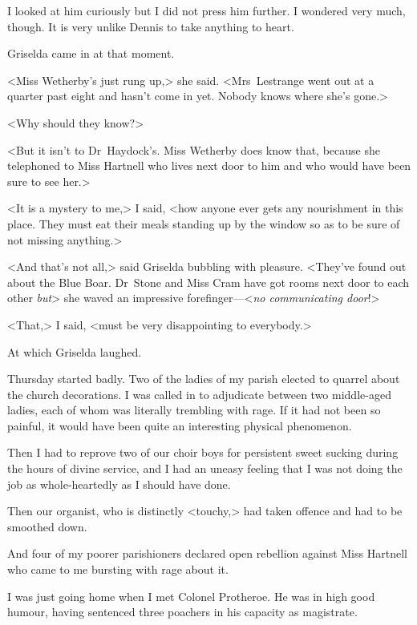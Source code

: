 I looked at him curiously but I did not press him further. I wondered very much, though. It is very unlike Dennis to take anything to heart.

Griselda came in at that moment.

<Miss Wetherby's just rung up,> she said. <Mrs~Lestrange went out at a quarter past eight and hasn't come in yet. Nobody knows where she's gone.>

<Why should they know?>

<But it isn't to Dr~Haydock's. Miss Wetherby does know that, because she telephoned to Miss Hartnell who lives next door to him and who would have been sure to see her.>

<It is a mystery to me,> I said, <how anyone ever gets any nourishment in this place. They must eat their meals standing up by the window so as to be sure of not missing anything.>

<And that's not all,> said Griselda bubbling with pleasure. <They've found out about the Blue Boar. Dr~Stone and Miss Cram have got rooms next door to each other \emph{but}\longdash> she waved an impressive forefinger—<\emph{no communicating door}!>

<That,> I said, <must be very disappointing to everybody.>

At which Griselda laughed.

Thursday started badly. Two of the ladies of my parish elected to quarrel about the church decorations. I was called in to adjudicate between two middle-aged ladies, each of whom was literally trembling with rage. If it had not been so painful, it would have been quite an interesting physical phenomenon.

Then I had to reprove two of our choir boys for persistent sweet sucking during the hours of divine service, and I had an uneasy feeling that I was not doing the job as whole-heartedly as I should have done.

Then our organist, who is distinctly <touchy,> had taken offence and had to be smoothed down.

And four of my poorer parishioners declared open rebellion against Miss Hartnell who came to me bursting with rage about it.

I was just going home when I met Colonel Protheroe. He was in high good humour, having sentenced three poachers in his capacity as magistrate.

